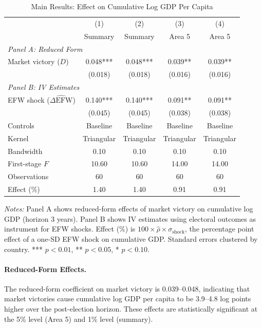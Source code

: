 \documentclass[12pt,a4paper]{article}
\newcommand{\efw}{\text{EFW}}
\begin{document}
\begin{table}[H]
\centering
\caption{Main Results: Effect on Cumulative Log GDP Per Capita}
\label{tab:main_results}
\begin{threeparttable}
\begin{tabular}{lcccc}
\toprule
 & (1) & (2) & (3) & (4) \\
 & Summary & Summary & Area 5 & Area 5 \\
\midrule
\multicolumn{5}{l}{\textit{Panel A: Reduced Form}} \\
[0.3em]
Market victory ($D$) & 0.048*** & 0.048*** & 0.039** & 0.039** \\
 & (0.018) & (0.018) & (0.016) & (0.016) \\
\midrule
\multicolumn{5}{l}{\textit{Panel B: IV Estimates}} \\
[0.3em]
EFW shock ($\widehat{\Delta \efw}$) & 0.140*** & 0.140*** & 0.091** & 0.091** \\
 & (0.045) & (0.045) & (0.038) & (0.038) \\
\midrule
Controls & Baseline & Baseline & Baseline & Baseline \\
Kernel & Triangular & Triangular & Triangular & Triangular \\
Bandwidth & 0.10 & 0.10 & 0.10 & 0.10 \\
First-stage $F$ & 10.60 & 10.60 & 14.00 & 14.00 \\
\midrule
Observations & 60 & 60 & 60 & 60 \\
Effect (\%) & 1.40 & 1.40 & 0.91 & 0.91 \\
\bottomrule
\end{tabular}
\begin{tablenotes}
\small
\item \textit{Notes:} Panel A shows reduced-form effects of market victory 
on cumulative log GDP (horizon 3 years). Panel B shows IV estimates using 
electoral outcomes as instrument for EFW shocks. Effect (\%) is 
$100 \times \hat{\rho} \times \sigma_{\text{shock}}$, the percentage 
point effect of a one-SD EFW shock on cumulative GDP. Standard errors 
clustered by country. *** $p < 0.01$, ** $p < 0.05$, * $p < 0.10$.
\end{tablenotes}
\end{threeparttable}
\end{table}

\paragraph{Reduced-Form Effects.}
The reduced-form coefficient on market victory is 0.039--0.048, indicating 
that market victories cause cumulative log GDP per capita to be 3.9--4.8 
log points higher over the post-election horizon. These effects are 
statistically significant at the 5\% level (Area 5) and 1\% level (summary).
\end{document}
